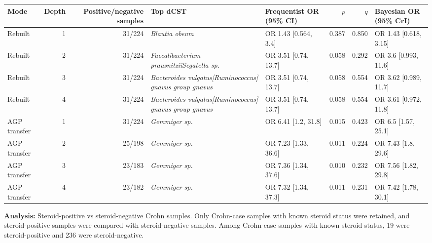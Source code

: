 \begin{center}
\scriptsize
\begin{tabularx}{\textwidth}{@{} l r r Y Y r r Y @{}}
\toprule
Mode & Depth & Positive/negative samples & Top dCST & Frequentist OR (95\% CI) & \(p\) & \(q\) & Bayesian OR (95\% CrI) \\
\midrule
Rebuilt & 1 & 31/224 & \emph{Blautia obeum} & OR 1.43 [0.564, 3.4] & 0.387 & 0.850 & OR 1.43 [0.618, 3.15] \\
Rebuilt & 2 & 31/224 & \emph{Faecalibacterium prausnitzii}\dcstsep \emph{Segatella sp.} & OR 3.51 [0.74, 13.7] & 0.058 & 0.292 & OR 3.6 [0.993, 11.6] \\
Rebuilt & 3 & 31/224 & \emph{Bacteroides vulgatus}\dcstsep \emph{[Ruminococcus] gnavus group gnavus} & OR 3.51 [0.74, 13.7] & 0.058 & 0.554 & OR 3.62 [0.989, 11.7] \\
Rebuilt & 4 & 31/224 & \emph{Bacteroides vulgatus}\dcstsep \emph{[Ruminococcus] gnavus group gnavus} & OR 3.51 [0.74, 13.7] & 0.058 & 0.554 & OR 3.61 [0.972, 11.8] \\
AGP transfer & 1 & 31/224 & \emph{Gemmiger sp.} & OR 6.41 [1.2, 31.8] & 0.015 & 0.423 & OR 6.5 [1.57, 25.1] \\
AGP transfer & 2 & 25/198 & \emph{Gemmiger sp.} & OR 7.23 [1.33, 36.6] & 0.011 & 0.224 & OR 7.43 [1.8, 29.6] \\
AGP transfer & 3 & 23/183 & \emph{Gemmiger sp.} & OR 7.36 [1.34, 37.6] & 0.010 & 0.232 & OR 7.56 [1.82, 29.8] \\
AGP transfer & 4 & 23/182 & \emph{Gemmiger sp.} & OR 7.32 [1.34, 37.3] & 0.011 & 0.231 & OR 7.42 [1.78, 30.1] \\
\bottomrule
\end{tabularx}
\end{center}
\bigskip

\noindent\textbf{Analysis:} Steroid-positive vs steroid-negative Crohn samples. Only Crohn-case samples with known steroid status were retained, and steroid-positive samples were compared with steroid-negative samples. Among Crohn-case samples with known steroid status, 19 were steroid-positive and 236 were steroid-negative.

